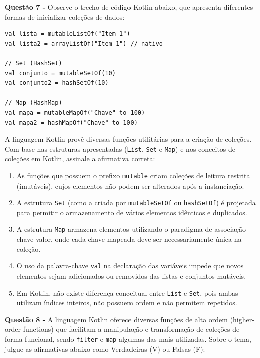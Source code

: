 \documentclass[12pt,a4paper]{article}
\begin{document}
\textbf{Questão 7 - } Observe o trecho de código Kotlin abaixo, que apresenta diferentes formas de inicializar coleções de dados:

\begin{lstlisting}[basicstyle=\small\ttfamily, breaklines=true]
val lista = mutableListOf("Item 1")
val lista2 = arrayListOf("Item 1") // nativo

// Set (HashSet)
val conjunto = mutableSetOf(10)
val conjunto2 = hashSetOf(10)

// Map (HashMap)
val mapa = mutableMapOf("Chave" to 100)
val mapa2 = hashMapOf("Chave" to 100)
\end{lstlisting}

A linguagem Kotlin provê diversas funções utilitárias para a criação de coleções. Com base nas estruturas apresentadas (\texttt{List}, \texttt{Set} e \texttt{Map}) e nos conceitos de coleções em Kotlin, assinale a afirmativa correta:

\begin{enumerate}[label=\alph*)]
    \item As funções que possuem o prefixo \texttt{mutable} criam coleções de leitura restrita (imutáveis), cujos elementos não podem ser alterados após a instanciação.
    \item A estrutura \texttt{Set} (como a criada por \texttt{mutableSetOf} ou \texttt{hashSetOf}) é projetada para permitir o armazenamento de vários elementos idênticos e duplicados.
    \item A estrutura \texttt{Map} armazena elementos utilizando o paradigma de associação chave-valor, onde cada chave mapeada deve ser necessariamente única na coleção.
    \item O uso da palavra-chave \texttt{val} na declaração das variáveis impede que novos elementos sejam adicionados ou removidos das listas e conjuntos mutáveis.
    \item Em Kotlin, não existe diferença conceitual entre \texttt{List} e \texttt{Set}, pois ambas utilizam índices inteiros, não possuem ordem e não permitem repetidos.
\end{enumerate}

\vspace{0.5cm}

\textbf{Questão 8 - } A linguagem Kotlin oferece diversas funções de alta ordem (higher-order functions) que facilitam a manipulação e transformação de coleções de forma funcional, sendo \texttt{filter} e \texttt{map} algumas das mais utilizadas. Sobre o tema, julgue as afirmativas abaixo como Verdadeiras (V) ou Falsas (F):
\end{document}
